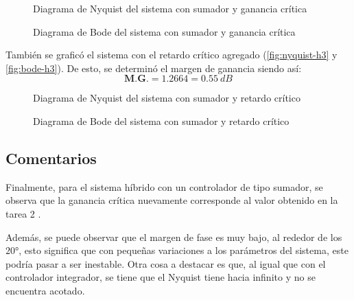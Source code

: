 \begin{figure}[h]
  \centering
  
  \caption{Diagrama de Nyquist del sistema con sumador y ganancia crítica}
  \label{fig:nyquist-h2}
\end{figure}

\begin{figure}[h]
  \centering
  
  \caption{Diagrama de Bode del sistema con sumador y ganancia crítica}
  \label{fig:bode-h2}
\end{figure}

También se graficó el sistema con el retardo crítico agregado (\autoref{fig:nyquist-h3} y
\autoref{fig:bode-h3}). De esto, se determinó el margen de ganancia siendo así:
\begin{equation}
  \boxed{\textbf{M.G.} = 1.2664 = 0.55\ \unit{dB}}
\end{equation}

\begin{figure}[h]
  \centering
  
  \caption{Diagrama de Nyquist del sistema con sumador y retardo crítico}
  \label{fig:nyquist-h3}
\end{figure}

\begin{figure}[h]
  \centering
  
  \caption{Diagrama de Bode del sistema con sumador y retardo crítico}
  \label{fig:bode-h3}
\end{figure}


\FloatBarrier
\subsection{Comentarios}

Finalmente, para el sistema híbrido con un controlador de tipo sumador, se observa que
la ganancia crítica nuevamente corresponde al valor obtenido en la tarea 2 \cite{tarea-2-sdc}.

Además, se puede observar que el margen de fase es muy bajo, al rededor de los
$\ang{20}$, esto significa que con pequeñas variaciones a los parámetros del
sistema, este podría pasar a ser inestable. Otra cosa a destacar es que, al igual
que con el controlador integrador, se tiene que el Nyquist tiene hacia infinito
y no se encuentra acotado.


